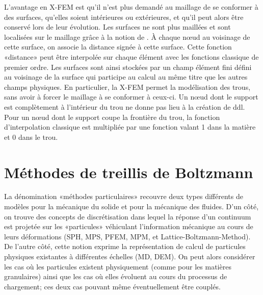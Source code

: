 \medskip
L'avantage en X-FEM est qu'il n'est plus demandé au maillage de se conformer à des surfaces, qu'elles soient intérieures ou extérieures, et qu'il peut alors être conservé lors de leur évolution. Les surfaces ne sont plus maillées et sont localisées sur le maillage grâce à la notion de . À chaque nœud au voisinage de cette surface, on associe la distance signée à cette surface. Cette fonction «distance» peut être interpolée sur chaque élément avec les fonctions classique de premier ordre. Les surfaces sont ainsi stockées par un champ élément fini défini au voisinage de la surface qui participe au calcul au même titre que les autres champs physiques. En particulier, la X-FEM permet la modélisation des trous, sans avoir à forcer le maillage à se conformer à ceux-ci. Un nœud dont le support est complètement à l'intérieur du trou ne donne pas lieu à la création de ddl. Pour un nœud dont le support coupe la frontière du trou, la fonction d'interpolation classique est multipliée par une fonction valant 1 dans la matière et 0 dans le trou.


\medskip
\section{Méthodes de treillis de Boltzmann}\label{Sec-PBM}

La dénomination «méthodes particulaires» recouvre deux types différents de modèles pour la mécanique du solide et pour la mécanique des fluides. D'un côté, on trouve des concepts de discrétisation dans lequel la réponse d'un continuum est projetée sur les «particules» véhiculant l'information mécanique au cours de leurs déformations (SPH, MPS, PFEM, MPM, et Lattice-Boltzmann-Method). De l'autre côté, cette notion exprime la représentation de calcul de particules physiques existantes à différentes échelles (MD, DEM). On peut alors considérer les cas où les particules existent physiquement (comme pour les matières granulaires) ainsi que les cas où elles évoluent au cours du processus de chargement; ces deux cas pouvant même éventuellement être couplés.


